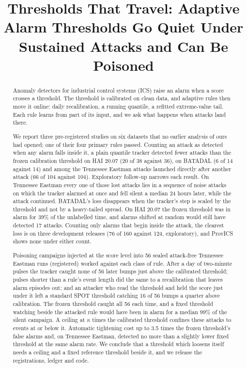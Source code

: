 \documentclass[letterpaper,twocolumn,10pt]{article}
\title{\Large \bf Thresholds That Travel: Adaptive Alarm Thresholds Go Quiet Under
  Sustained Attacks and Can Be Poisoned}
\author{}
\date{}
\begin{document}
\maketitle
\thispagestyle{empty}
\pagestyle{plain}

\begin{abstract}
Anomaly detectors for industrial control systems (ICS) raise an alarm when a score crosses a
threshold. The threshold is calibrated on clean data, and adaptive rules then move it online: daily
recalibration, a running quantile, a refitted extreme-value tail. Each rule learns from part of its
input, and we ask what happens when attacks land there.

We report three pre-registered studies on six datasets that no earlier analysis of ours had opened;
one of their four primary rules passed. Counting an attack as detected when any alarm falls inside it,
a plain quantile tracker detected fewer attacks than the frozen calibration threshold on HAI 20.07 (20
of 38 against 36), on BATADAL (6 of 14 against 14) and among the Tennessee Eastman attacks launched
directly after another attack (66 of 104 against 104). Exploratory follow-up narrows each result. On
Tennessee Eastman every one of those lost attacks lies in a sequence of noise attacks on which the tracker alarmed
at once and fell silent a median 24 hours later, while the attack continued. BATADAL's loss disappears
when the tracker's step is scaled by the threshold and not by a heavy-tailed spread. On HAI 20.07 the
frozen threshold was in alarm for 39\% of the unlabelled time, and alarms shifted at random would still
have detected 17 attacks. Counting only alarms that begin inside the attack, the clearest loss is on
three development releases (76 of 160 against 124, exploratory), and ProvICS shows none under either
count.

Poisoning campaigns injected at the score level into 56 sealed attack-free Tennessee Eastman runs
(registered) worked against each class of rule. After a day of two-minute pulses the tracker caught
none of 56 later bumps just above the calibrated threshold; pulses shorter than a rule's event length
did the same to a recalibration that leaves alarm episodes out; and an attacker who read the threshold
and held the score just under it left a standard SPOT threshold catching 16 of 56 bumps a quarter above
calibration. The frozen threshold caught all 56 each time, and a fixed threshold watching beside the
attacked rule would have been in alarm for a median 99\% of the silent campaign. A ceiling at $\kappa$
times the calibrated threshold confines these attacks to events at or below it. Automatic tightening
cost up to 3.5 times the frozen threshold's false alarms and, on Tennessee Eastman, detected no more
than a slightly lower fixed threshold at the same alarm rate. We conclude that a threshold which
loosens itself needs a ceiling and a fixed reference threshold beside it, and we release the
registrations, ledger and code.
\end{abstract}
\end{document}
